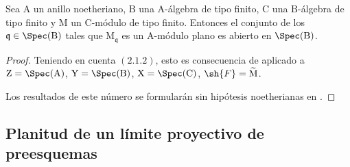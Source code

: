 \begin{corollary}[11.1.6]
\label{IV.11.1.6}
Sea $\mathrm{A}$ un anillo noetheriano, $\mathrm{B}$ una $\mathrm{A}$-álgebra de tipo finito, $\mathrm{C}$ una $\mathrm{B}$-álgebra de tipo finito y $\mathrm{M}$ un $\mathrm{C}$-módulo de tipo finito. Entonces el conjunto de los $\mathfrak{q}\in\Spec(\mathrm{B})$ tales que $\mathrm{M}_\mathfrak{q}$ es un $\mathrm{A}$-módulo plano es abierto en $\Spec(\mathrm{B})$.
\end{corollary}

\begin{proof}
Teniendo en cuenta $(2.1.2)$, esto es consecuencia de  aplicado a $\mathrm{Z}=\Spec(\mathrm{A})$, $\mathrm{Y}=\Spec(\mathrm{B})$, $\mathrm{X}=\Spec(\mathrm{C})$, $\sh{F}=\widetilde{\mathrm{M}}$.

Los resultados de este número se formularán sin hipótesis noetherianas en .
\end{proof}

\subsection{Planitud de un límite proyectivo de preesquemas}
\label{subsection:IV.11.2}


